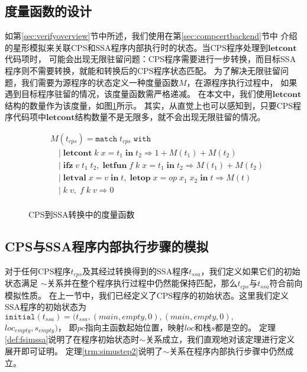 \subsection{度量函数的设计}

如第\ref{sec:verifyoverview}节中所述，我们使用在第\ref{sec:compcertbackend}节中
介绍的星形模拟来关联CPS和SSA程序内部执行时的状态。当CPS程序处理到$\mathbf{letcont}$代码项时，
可能会出现无限驻留问题：CPS程序需要进行一步转换，而目标SSA程序则不需要转换，就能和转换后的CPS程序状态匹配。
为了解决无限驻留问题，我们需要为源程序的状态定义一种度量函数$M$，在源程序执行过程中，
如果遇到目标程序驻留的情况，该度量函数需严格递减。
在本文中，我们使用$\mathbf{letcont}$结构的数量作为该度量，如图\ref{fig:measure}所示。
其实，从直觉上也可以感知到，只要CPS程序代码项中$\mathbf{letcont}$结构数量不是无限多，就不会出现无限驻留的情况。

\begin{figure}[htbp]
    \centering
    \begin{equation}
    \nonumber
        \begin{aligned}
            & M(t_{cps}) = \mathtt{match}\; t_{cps}\; \mathtt{with} \\
            & \quad |\; \mathbf{letcont}\; k\; x=t_1\; \mathbf{in}\; t_2 \Rightarrow 1 + M(t_1) + M(t_2) \\
            & \quad |\; \mathbf{ifz}\; v\; t_1\; t_2,\; \mathbf{letfun}\; f\; k\; x=t_1\; \mathbf{in}\; t_2 \Rightarrow M(t_1) + M(t_2) \\
            & \quad |\; \mathbf{letval}\; x=v\; \mathbf{in}\; t,\; \mathbf{letop}\; x=op\; x_1\; x_2\; \mathbf{in}\; t \Rightarrow M(t)\\
            & \quad |\; k\; v,\; f\; k\; v \Rightarrow 0 \\
        \end{aligned}
    \end{equation}
    \caption{CPS到SSA转换中的度量函数}\label{fig:measure}
\end{figure}


\subsection{CPS与SSA程序内部执行步骤的模拟}

对于任何CPS程序$t_{cps}$及其经过转换得到的SSA程序$t_{ssa}$，我们定义如果它们的初始状态满足
$\sim$关系并在整个程序执行过程中仍然能保持匹配，那么$t_{cps}$与$t_{ssa}$符合前向模拟性质。
在上一节中，我们已经定义了CPS程序的初始状态。这里我们定义SSA程序的初始状态为
$\mathtt{initial}(t_{ssa}) = (t_{ssa}, (main, empty, 0), (main, empty, 0),$ \\ $loc_{empty}, s_{empty})$，
即$pc$指向主函数起始位置，映射$loc$和栈$s$都是空的。
定理\ref{def:fsimssa}说明了在程序初始状态时$\sim$关系成立，我们直观地对该定理进行定义展开即可证明。
定理\ref{trm:simustep2}说明了$\sim$关系在程序内部执行步骤中仍然成立。

